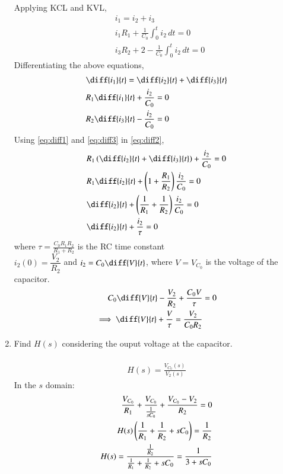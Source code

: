 \documentclass[journal,12pt,twocolumn]{IEEEtran}
\renewcommand\thesection{\arabic{section}}
\begin{document}
\begin{enumerate}[label=\arabic*.,ref=\thesection.\theenumi]
Applying KCL and KVL,
\begin{align}
	&i_1 = i_2 + i_3 \\
	&i_1R_1 + \frac{1}{C_0}\int_0^ti_2\, dt = 0 \\
	&i_3R_2 + 2 - \frac{1}{C_0}\int_0^ti_2\, dt = 0
\end{align}
Differentiating the above equations,
\begin{align}
	&\diff{i_1}{t} = \diff{i_2}{t} + \diff{i_3}{t} \label{eq:diff1}\\
	&R_1\diff{i_1}{t} + \frac{i_2}{C_0} = 0 \label{eq:diff2}\\
	&R_2\diff{i_3}{t} - \frac{i_2}{C_0} = 0 
	\label{eq:diff3}
\end{align}
Using \eqref{eq:diff1} and \eqref{eq:diff3} in \eqref{eq:diff2},
\begin{align}
	&R_1\brak{\diff{i_2}{t} + \diff{i_3}{t}} + \frac{i_2}{C_0} = 0 \\
	&R_1\diff{i_2}{t} + \brak{1 + \frac{R_1}{R_2}}\frac{i_2}{C_0} = 0 \\
	&\diff{i_2}{t} + \brak{\frac{1}{R_1} + \frac{1}{R_2}}\frac{i_2}{C_0} = 0 \\
	&\diff{i_2}{t} + \frac{i_2}{\tau} = 0
	\label{eq:diff-eqn-init}
\end{align}
where $\tau = \frac{C_0R_1R_2}{R_1 + R_2}$ is the RC time 
constant\\%
$i_2(0) = \dfrac{V_2}{R_2}$ and 
$i_2 = C_0\diff{V}{t}$, where $V = V_{C_0}$ is the voltage of the capacitor. 
\begin{align}
	C_0\diff{V}{t} - \frac{V_2}{R_2} + \frac{C_0V}{\tau} &= 0 \\
	\implies \diff{V}{t} + \frac{V}{\tau} = \frac{V_2}{C_0R_2}
	\label{eq:diff-eqn}
\end{align}
\item Find $H(s)$ considering the ouput voltage at the capacitor.\\
\solution\\
\begin{align}
		H(s) = \frac{V_{C_0}(s)}{V_2(s)}
\end{align}
In the $s$ domain:
\begin{align}
	\frac{V_{C_0}}{R_1} + \frac{V_{C_0}}{\frac{1}{sC_0}} + \frac{V_{C_0} - V_2}{R_2} = 0 \\
	H(s)\brak{\frac{1}{R_1} + \frac{1}{R_2} + sC_0} = \frac{1}{R_2} \\
	H(s) = \frac{\frac{1}{R_2}}{\frac{1}{R_1} + \frac{1}{R_2} + sC_0} = \dfrac{1}{3 + sC_0}

\end{align}
\end{enumerate}
\end{document}
